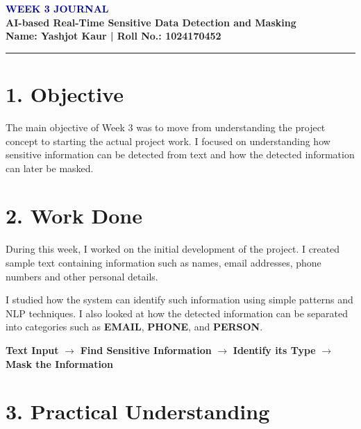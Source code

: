 \documentclass[11pt,a4paper]{article}
\begin{document}
\begin{center}
    {\LARGE \textbf{\textcolor{darkblue}{WEEK 3 JOURNAL}}}\\[5pt]
    {\large \textbf{AI-based Real-Time Sensitive Data Detection and Masking}}\\[6pt]
    \textbf{Name: Yashjot Kaur \quad | \quad Roll No.: 1024170452}
\end{center}

\vspace{4pt}
\hrule
\vspace{8pt}

\section*{1. Objective}

The main objective of Week 3 was to move from understanding the project
concept to starting the actual project work. I focused on understanding
how sensitive information can be detected from text and how the detected
information can later be masked.

\section*{2. Work Done}

During this week, I worked on the initial development of the project. I
created sample text containing information such as names, email addresses,
phone numbers and other personal details.

I studied how the system can identify such information using simple
patterns and NLP techniques. I also looked at how the detected information
can be separated into categories such as \textbf{EMAIL}, \textbf{PHONE},
and \textbf{PERSON}.

\begin{center}
\begin{tcolorbox}[
    colback=gray!5,
    colframe=darkblue,
    width=0.9\textwidth,
    arc=2mm,
    boxrule=0.5pt
]
\centering
\textbf{Text Input}
$\rightarrow$
\textbf{Find Sensitive Information}
$\rightarrow$
\textbf{Identify its Type}
$\rightarrow$
\textbf{Mask the Information}
\end{tcolorbox}
\end{center}

\section*{3. Practical Understanding}
\end{document}

